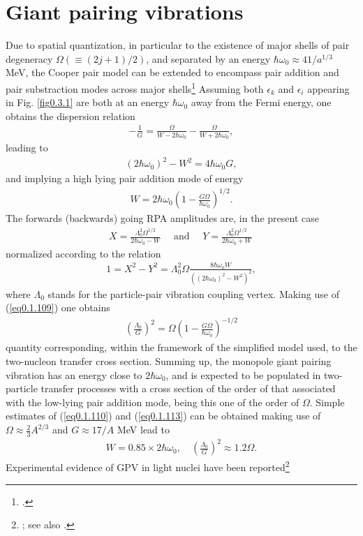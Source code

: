 \documentclass[a4paper,11pt]{book}
\numberwithin{equation}{section}
\numberwithin{figure}{section}
\numberwithin{table}{section}
\begin{document}
\section{Giant pairing vibrations}
Due to spatial quantization, in particular to the existence of major shells of pair degeneracy $\Omega(\equiv(2j+1)/2)$, and separated by an energy $\hbar\omega_0\approx41/a^{1/3}$ MeV, the Cooper pair model can be extended to encompass pair addition and pair substraction modes across major shells\footnote{\cite{Broglia:77}.} Assuming both $\epsilon_k$ and $\epsilon_i$ appearing in Fig. \ref{fig0.3.1} are both at an energy    $\hbar\omega_0$ away from the Fermi energy, one obtains the dispersion relation 
\begin{align}\label{eq0.1.108}
-\frac{1}{G}=\frac{\Omega}{W-2\hbar\omega_0}-\frac{\Omega}{W+2\hbar\omega_0},
\end{align}
leading to
\begin{align}\label{eq0.1.109}
(2\hbar\omega_0)^2-W^2=4\hbar\omega_0G,
\end{align}
and implying a high lying pair addition mode of energy
\begin{align}\label{eq0.1.110}
W=2\hbar\omega_0\left(1-\frac{G\Omega}{\hbar\omega_0}\right)^{1/2}.
\end{align}
The forwards (backwards) going RPA amplitudes are, in the present case
\begin{align}\label{eq0.1.111}
X=\frac{\Lambda_0^2\Omega^{1/2}}{2\hbar\omega_0-W}\quad\text{ and      }\quad Y=\frac{\Lambda_0^2\Omega^{1/2}}{2\hbar\omega_0+W}\
\end{align}
normalized according to the relation 
\begin{align}\label{eq0.1.112}
1=X^2-Y^2=\Lambda^2_0\Omega\frac{8\hbar\omega_0W}{\left((2\hbar\omega_0)^2-W^2\right)^2},
\end{align}
where $\Lambda_0$ stands for the particle-pair vibration coupling vertex. Making use of (\ref{eq0.1.109}) one obtains
\begin{align}\label{eq0.1.113}
\left(\frac{\Lambda_0}{G}\right)^2=\Omega\left(1-\frac{G\Omega}{\hbar\omega_0}\right)^{-1/2}
\end{align}
quantity corresponding, within the framework of the simplified model used, to the two-nucleon transfer cross section. Summing up, the monopole giant pairing vibration has an energy close to $2\hbar\omega_0$, and is expected to be populated in two-particle transfer processes with a cross section of the order of that associated with the low-lying pair addition mode, being this one of the order of $\Omega$. Simple estimates of (\ref{eq0.1.110}) and (\ref{eq0.1.113}) can be obtained making use of $\Omega\approx\frac{2}{3}A^{2/3}$
and $G\approx17/A$ MeV lead to
\begin{align}\label{eq0.1.114}
W=0.85\times2\hbar\omega_0,\quad\left(\frac{\Lambda_0}{G}\right)^2\approx1.2 \Omega.
\end{align}
Experimental evidence of GPV in light nuclei have been reported\footnote{\cite{Cappuzzello:15}; see also \cite{Bortignon:16}.}
\end{document}
